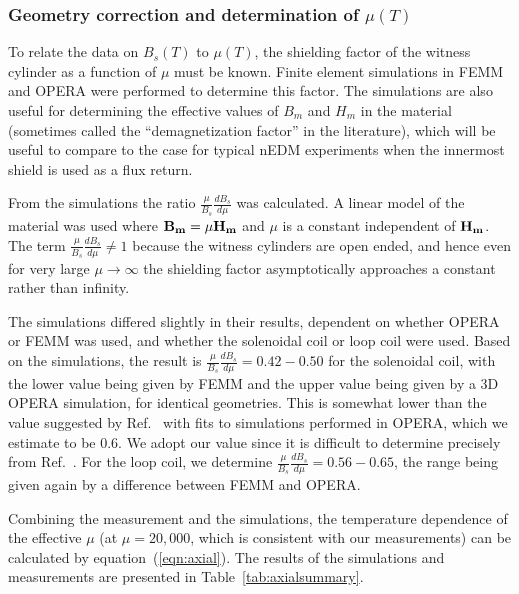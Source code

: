 



\subsubsection{Geometry correction and determination of $\mu(T)$\label{sec:axialsims}}

To relate the data on $B_s(T)$ to $\mu(T)$, the shielding factor of
the witness cylinder as a function of $\mu$ must be known.  Finite
element simulations in FEMM and OPERA were performed to determine this
factor.  The simulations are also useful for determining the effective
values of $B_m$ and $H_m$ in the material (sometimes called the
``demagnetization factor'' in the literature), which will be useful to
compare to the case for typical nEDM experiments when the innermost
shield is used as a flux return.


From the simulations the ratio $\frac{\mu}{B_s} \frac{dB_s}{d\mu}$ was
calculated.  A linear model of the material was used where
$\bold{B_m}=\mu \bold{H_m}$ and $\mu$ is a constant independent of
$\bold{H_m}$.  The term $\frac{\mu}{B_s}\frac{dB_s}{d\mu}\neq 1$
because the witness cylinders are open ended, and hence even for very
large $\mu\rightarrow\infty$ the shielding factor asymptotically
approaches a constant rather than infinity.

The simulations differed slightly in their results, dependent on
whether OPERA or FEMM was used, and whether the solenoidal coil or
loop coil were used.  Based on the simulations, the result is
$\frac{\mu}{B_s}\frac{dB_s}{d\mu}=0.42-0.50$ for the solenoidal coil,
with the lower value being given by FEMM and the upper value being
given by a 3D OPERA simulation, for identical geometries.  This is
somewhat lower than the value suggested by
Ref.~\cite{bib:paperno-open-ended} with fits to simulations performed
in OPERA, which we estimate to be 0.6.  We adopt our value since it is
difficult to determine precisely from
Ref.~\cite{bib:paperno-open-ended}.  For the loop coil, we determine
$\frac{\mu}{B_s}\frac{dB_s}{d\mu}=0.56-0.65$, the range being given
again by a difference between FEMM and OPERA.

Combining the measurement and the simulations, the temperature
dependence of the effective $\mu$ (at $\mu=20,000$, which is
consistent with our measurements) can be calculated by
equation~(\ref{eqn:axial}).  The results of the simulations and
measurements are presented in Table~\ref{tab:axialsummary}.

